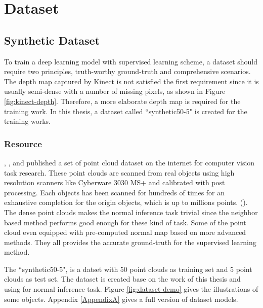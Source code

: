 
\chapter{Dataset} %

\label{ch:04} %


\section{Synthetic Dataset}
To train a deep learning model with supervised learning scheme, a dataset should require two principles, truth-worthy ground-truth and comprehensive scenarios. The depth map captured by Kinect is not satisfied the first requirement since it is usually semi-dense with a number of missing pixels, as shown in Figure \ref{fig:kinect-depth}. Therefore, a more elaborate depth map is required for the training work. In this thesis, a dataset called ``synthetic50-5" is created for the training works.


\subsection{Resource}
\cite{data1}, \cite{data2}, \cite{data3} and \cite{data4} published a set of point cloud dataset on the internet for computer vision task research. These point clouds are scanned from real objects using high resolution scanners like Cyberware 3030 MS+ and calibrated with post processing. Each objects has been scanned for hundreds of times for an exhaustive completion for the origin objects, which is up to millions points. (\cite{data1}). The dense point clouds makes the normal inference task trivial since the neighbor based method performs good enough for these kind of task. Some of the point cloud even equipped with pre-computed normal map based on more advanced methods. They all provides the accurate ground-truth for the supervised learning method.

The ``synthetic50-5", is a datset with 50 point clouds as training set and 5 point clouds as test set. The dataset is created base on the work of this thesis and using for normal inference task. Figure \ref{fig:dataset-demo} gives the illustrations of some objects. Appendix \ref{AppendixA} gives a full version of dataset models.

